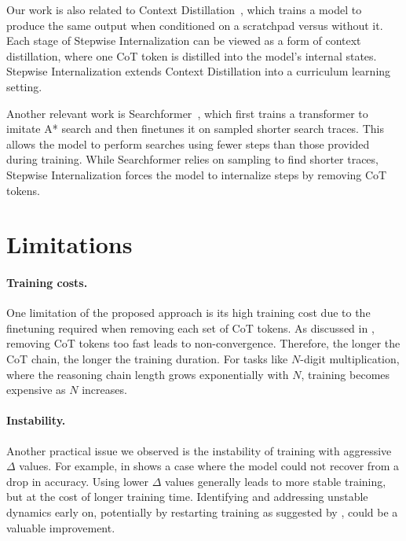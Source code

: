 \documentclass{article}
\begin{document}
Our work is also related to Context Distillation~\citep{snell2022learning}, which trains a model to produce the same output when conditioned on a scratchpad versus without it. Each stage of Stepwise Internalization can be viewed as a form of context distillation, where one CoT token is distilled into the model's internal states. Stepwise Internalization extends Context Distillation into a curriculum learning setting. %

Another relevant work is Searchformer~\citep{lehnert2024a}, which first trains a transformer to imitate A* search and then finetunes it on sampled shorter search traces. This allows the model to perform searches using fewer steps than those provided during training. While Searchformer relies on sampling to find shorter traces, Stepwise Internalization forces the model to internalize steps by removing CoT tokens. %

\section{\label{sec:limitations}Limitations}
\paragraph{Training costs.}
One limitation of the proposed approach is its high training cost due to the finetuning required when removing each set of CoT tokens. As discussed in , removing CoT tokens too fast leads to non-convergence. Therefore, the longer the CoT chain, the longer the training duration. For tasks like $N$-digit multiplication, where the reasoning chain length grows exponentially with $N$, training becomes expensive as $N$ increases. 

\paragraph{Instability.}
Another practical issue we observed is the instability of training with aggressive $\Delta$ values. For example,  in  shows a case where the model could not recover from a drop in accuracy. Using lower $\Delta$ values generally leads to more stable training, but at the cost of longer training time. Identifying and addressing unstable dynamics early on, potentially by restarting training as suggested by \citet{hu2024latent}, could be a valuable improvement.
\end{document}
